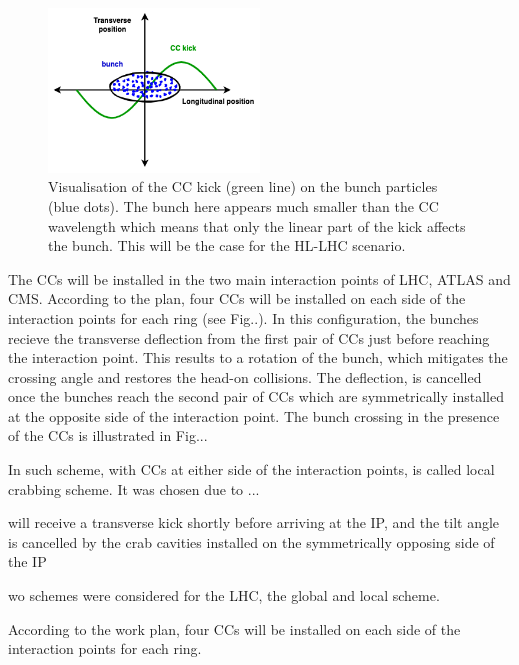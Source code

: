 \begin{figure}[!h] %
    \centering         
    \includegraphics[width=0.5\textwidth]{images/introduction/sin_CC_kick_LHC_beams.drawio.png}
        \caption{Visualisation of the CC kick (green line) on the bunch particles (blue dots). The bunch here appears much smaller than the CC wavelength which means that only the linear part of the kick affects the bunch. This will be the case for the HL-LHC scenario.}
        \label{fig:cc_simple_kick}
 \end{figure}


The CCs will be installed in the two main interaction points of LHC, ATLAS and CMS. According to the plan, four CCs will be installed on each side of the interaction points for each ring (see Fig..). In this configuration, the bunches recieve the transverse deflection from the first pair of CCs just before reaching the interaction point. This results to a rotation of the bunch, which mitigates the crossing angle and restores the head-on collisions. The deflection, is cancelled once the bunches reach the second pair of CCs which are symmetrically installed at the opposite side of the interaction point. The bunch crossing in the presence of the CCs is illustrated in Fig...


In such scheme, with CCs at either side of the interaction points, is called local crabbing scheme. It was chosen due to ... 


will receive a transverse kick shortly before arriving at the
IP, and the tilt angle is cancelled by the crab cavities
installed on the symmetrically opposing side of the IP




wo schemes were considered for the LHC, the global and local scheme. 



According to the work plan, four CCs will be installed on each side of the interaction points for each ring.

